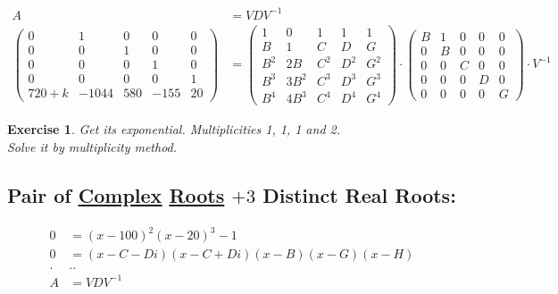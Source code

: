 \documentclass[12pt,a4paper]{article}
\newtheorem{exercise}{Exercise}[section]
\begin{document}
\begin{align}
A &= VDV^{-1} \\
\left( \begin{matrix} 0&1&0&0&0 \\ 0&0&1&0&0 \\ 0&0&0&1&0 \\ 0&0&0&0&1 \\ 720 + k & -1044 & 580 & -155 & 20 \end{matrix} \right)
&=
\left( \begin{matrix} 1&0&1&1&1 \\ B&1&C&D&G \\ B^2&2B&C^2&D^2&G^2 \\ B^3&3B^2&C^3&D^3&G^3 \\ B^4&4B^3&C^4&D^4&G^4 \end{matrix} \right) \cdot
\left( \begin{matrix} B & 1&0&0&0 \\ 0 & B&0&0&0 \\ 0 & 0 & C & 0 & 0 \\ 0 & 0 & 0 & D & 0 \\ 0 & 0 & 0 & 0 & G \end{matrix} \right) \cdot
V^{-1}
\end{align}

\begin{exercise}
Get its exponential. Multiplicities 1, 1, 1 and 2. \\
Solve it by multiplicity method.
\end{exercise}

\subsection{Pair of \href{https://www.wolframalpha.com/input/?i=(x+-+100)\%5E2+*+(x+-+20)\%5E3+-+1+\%3D+0}{\color{blue}\underline{Complex}} \href{}{Roots} $+ 3$ Distinct Real Roots:}

\begin{align}
0 &= (x - 100)^2 (x - 20)^3 - 1 \\
0 &= (x - C - Di)(x - C + Di)(x - B)(x - G)(x - H) \\
.&.. \nonumber \\
A &= VDV^{-1}
\end{align}
\end{document}
